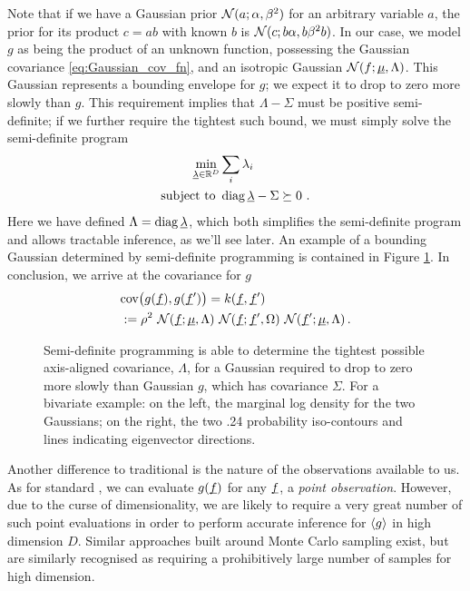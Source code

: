 \documentclass[twoside]{article}
\begin{document}
Note that if we have a Gaussian prior $\mathcal{N}(a;\alpha,\beta^2)$ for an arbitrary variable $a$, the prior for its product $c = a b$ with known $b$ is $\mathcal{N}(c;b \alpha,b \beta^2 b)$. In our case, we model $g$ as being the product of an unknown function, possessing the Gaussian covariance \eqref{eq:Gaussian_cov_fn}, and an isotropic Gaussian $\mathcal{N}(f;\underline{\smash{\mu}},\Lambda)$. This Gaussian represents a bounding envelope for $g$; we expect it to drop to zero more slowly than $g$. This requirement implies that $\Lambda - \Sigma$ must be positive semi-definite; if we further require the tightest such bound, we must simply solve the semi-definite program
\begin{align}
 \min_{\underline{\smash{\lambda}}\in\mathbb{R}^D} & \sum_i \lambda_i\\
\text{subject to } & \operatorname{diag}{\underline{\smash{\lambda}}} - \Sigma \succeq 0~.
\end{align}
Here we have defined $\Lambda = \operatorname{diag} \underline{\smash{\lambda}}$, which both simplifies the semi-definite program and allows tractable inference, as we'll see later. An example of a bounding Gaussian determined by semi-definite programming is contained in Figure \ref{fig:bounding_ellipse}. In conclusion, we arrive at the covariance for $g$
\begin{align}
 & \text{cov}\bigl(g(\underline{\smash{f}}), g(\underline{\smash{f}}')\bigr) = k(\underline{\smash{f}}, \underline{\smash{f}}')\nonumber\\ & := \rho^2~\mathcal{N}(\underline{\smash{f}};\underline{\smash{\mu}},\Lambda)~\mathcal{N}(\underline{\smash{f}};\underline{\smash{f}}',\Omega)~\mathcal{N}(\underline{\smash{f}}';\underline{\smash{\mu}},\Lambda)\,.
\end{align}

\begin{figure}
\caption{Semi-definite programming is able to determine the tightest possible axis-aligned covariance, $\Lambda$, for a Gaussian required to drop to zero more slowly than Gaussian $g$, which has covariance $\Sigma$. For a bivariate example: on the left, the marginal log density for the two Gaussians; on the right, the two .24 probability iso-contours and lines indicating eigenvector directions.}
\label{fig:bounding_ellipse}
\end{figure}

Another difference to traditional  is the nature of the observations available to us. As for standard , we can evaluate $g(\underline{\smash{f}})$ for any $\underline{\smash{f}}$, a \emph{point observation}. However, due to the curse of dimensionality, we are likely to require a very great number of such point evaluations in order to perform accurate inference for $\langle g \rangle$ in high dimension $D$. Similar approaches built around Monte Carlo sampling \citep{genz1992numerical} exist, but are similarly recognised as requiring a prohibitively large number of samples for high dimension. 
\end{document}
